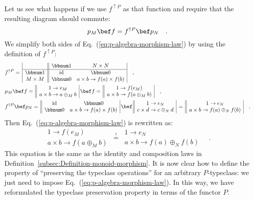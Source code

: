 \noindent Let us see what happens if we use $f^{\uparrow P}$ as that
function and require that the resulting diagram should commute:\vspace{-0.4\baselineskip}
\begin{equation}
p_{M}\bef f=f^{\uparrow P}\bef p_{N}\quad.\label{eq:p-algebra-morphism-law}
\end{equation}
We simplify both sides of Eq.~(\ref{eq:p-algebra-morphism-law})
by using the definition of $f^{\uparrow P}$:
\begin{align*}
 & f^{\uparrow P}=\,\begin{array}{|c||cc|}
 & \bbnum 1 & N\times N\\
\hline \bbnum 1 & \text{id} & \bbnum 0\\
M\times M & \bbnum 0 & a\times b\rightarrow f(a)\times f(b)
\end{array}\quad,\\
 & p_{M}\bef f=\,\begin{array}{||c|}
1\rightarrow e_{M}\\
a\times b\rightarrow a\oplus_{M}b
\end{array}\,\bef f=\,\begin{array}{||c|}
1\rightarrow f(e_{M})\\
a\times b\rightarrow f(a\oplus_{M}b)
\end{array}\quad,\\
 & f^{\uparrow P}\bef p_{N}=\,\begin{array}{||cc|}
\text{id} & \bbnum 0\\
\bbnum 0 & a\times b\rightarrow f(a)\times f(b)
\end{array}\,\bef\,\begin{array}{||c|}
1\rightarrow e_{N}\\
c\times d\rightarrow c\oplus_{N}d
\end{array}\,=\,\begin{array}{||c|}
1\rightarrow e_{N}\\
a\times b\rightarrow f(a)\oplus_{N}f(b)
\end{array}\quad.
\end{align*}
Then Eq.~(\ref{eq:p-algebra-morphism-law}) is rewritten as:
\[
\begin{array}{||c|}
1\rightarrow f(e_{M})\\
a\times b\rightarrow f(a\oplus_{M}b)
\end{array}\,\overset{!}{=}\,\begin{array}{||c|}
1\rightarrow e_{N}\\
a\times b\rightarrow f(a)\oplus_{N}f(b)
\end{array}\quad.
\]
This equation is the same as the identity and composition laws in
Definition~\ref{subsec:Definition-monoid-morphism}. It is now clear
how to define the property of \textsf{``}preserving the typeclass operations\textsf{''}
for an arbitrary $P$-typeclass: we just need to impose Eq.~(\ref{eq:p-algebra-morphism-law}).
In this way, we have reformulated the typeclass preservation property
in terms of the functor $P$.

